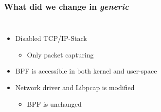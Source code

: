 \begin{frame}
	\frametitle{What did we change in \emph{generic}}
\begin{columns}
\begin{itemize}
	\item <2->Disabled TCP/IP-Stack
		\begin{itemize}
			\item Only packet capturing\newline
		\end{itemize}
	\item <3->BPF is accessible in both kernel and user-space\newline
	\item <4->Network driver and Libpcap is modified
		\begin{itemize}
			\item BPF is unchanged
		\end{itemize}
\end{itemize}
\vspace{-2em}

\end{columns}
\end{frame}
